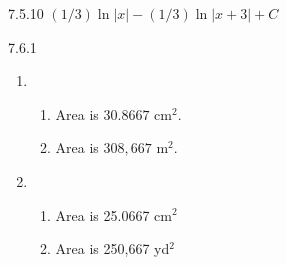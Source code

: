 \begin{Answer}{7.5.10}
 $(1/3)\ln|x|-(1/3)\ln|x+3| +C$
\end{Answer}
\begin{Answer}{7.6.1}
\begin{enumerate}
\item {\begin{enumerate}
\item		Area is $30.8667$ cm$^2$.
\item		Area is $308,667$ m$^2$.
\end{enumerate}
}

\item {\begin{enumerate}
\item		Area is 25.0667 cm$^2$
\item		Area is 250,667 yd$^2$
\end{enumerate}
}

\end{enumerate}
\end{Answer}
